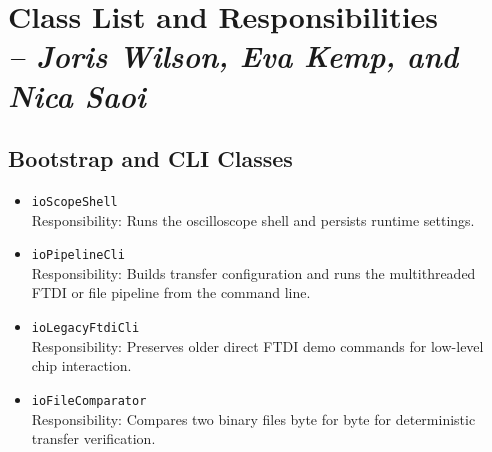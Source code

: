     \section{Class List and Responsibilities \\
    \small{\textit{-- Joris Wilson, Eva Kemp, and Nica Saoi}}}
    \label{Section::Class List and Responsibilities}

    \subsection{Bootstrap and CLI Classes}
    \begin{itemize}
        \item \texttt{ioScopeShell} \\
        Responsibility: Runs the oscilloscope shell and persists runtime settings.

        \item \texttt{ioPipelineCli} \\
        Responsibility: Builds transfer configuration and runs the multithreaded FTDI or file pipeline from the command line.

        \item \texttt{ioLegacyFtdiCli} \\
        Responsibility: Preserves older direct FTDI demo commands for low-level chip interaction.

        \item \texttt{ioFileComparator} \\
        Responsibility: Compares two binary files byte for byte for deterministic transfer verification.
    \end{itemize}

